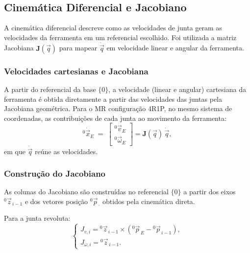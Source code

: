\subsection{Cinemática Diferencial e Jacobiano}

A cinemática diferencial descreve como as velocidades de junta geram as velocidades da ferramenta em um referencial escolhido.
Foi utilizada a matriz Jacobiana $\mathbf{J}(\vec q)$ para mapear
$\dot{\vec q}$ em velocidade linear e angular da ferramenta.

\subsubsection{Velocidades cartesianas e Jacobiana}
A partir do referencial da base $\{0\}$, a velocidade (linear e angular) cartesiana da ferramenta é obtida diretamente a partir das velocidades das juntas pela Jacobiana geométrica.
Para o MR configuração 4R1P, no mesmo sistema de coordenadas, as contribuições de cada junta ao movimento da ferramenta:
\begin{equation}
\label{eq:xdot_J_qdot}
{}^{0}\!\dot{\vec x}_{E} \;=\;
\begin{bmatrix}
{}^{0}\!\vec v_{E} \\
{}^{0}\!\vec \omega_{E}
\end{bmatrix}
= \mathbf{J}(\vec q)\,\dot{\vec q},
\end{equation}
em que $\dot{\vec q}$ reúne as velocidades.

\subsubsection{Construção do Jacobiano}
As colunas do Jacobiano são construídas no referencial $\{0\}$ a partir dos eixos
${}^{0}\!\vec z_{\,i-1}$ e
dos vetores posição ${}^{0}\!\vec p_{\,\cdot}$ obtidos pela cinemática direta.

Para a junta revoluta:
\begin{equation}
\begin{cases}
J_{v,i} =
{}^{0}\!\vec{z}_{\,i-1} \times 
\left({}^{0}\!\vec{p}_{\,E} - {}^{0}\!\vec{p}_{\,i-1}\right), \\
J_{\omega,i} =
{}^{0}\!\vec{z}_{\,i-1}.
\end{cases}
\end{equation}

